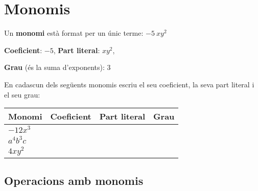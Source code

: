 \section{Monomis}

\begin{theorybox}


Un \textbf{monomi} està format per un únic terme:   $-5\ xy^2$                 

\textbf{Coeficient}: $-5$,   \textbf{Part literal}: $xy^2$,

\textbf{Grau }(és la suma d'exponents): 3

\vspace{0.75cm}

\end{theorybox}

\vspace{2cm}
\begin{mylist}


\exer \spen En cadascun dels següents monomis escriu el seu coeficient, la seva part literal i el seu grau:

\begin{center}
\renewcommand*{\arraystretch}{1.4}
\begin{longtable}{|p{1.2in}|p{1.1in}|p{1.0in}|p{1.0in}|} \hline 
\rowcolor{lightgray} Monomi & Coeficient & Part literal & Grau \\ \hline 
$-12x^{3} $ &  &  &  \\ \hline 
$a^{4} b^{3} c$ &  &  &  \\ \hline 
$4xy^{2} $ &  &  &  \\ \hline 
\end{longtable}
\end{center}


 \end{mylist}    

 

\subsection{Operacions amb monomis}

